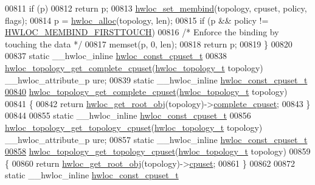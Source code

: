 \begin{DoxyCode}
00811   \textcolor{keywordflow}{if} (p)
00812     \textcolor{keywordflow}{return} p;
00813   \hyperlink{a00050_ga8b6d1d90227aff8e44ef26bc1f8a8f95}{hwloc_set_membind}(topology, cpuset, policy, flags);
00814   p = \hyperlink{a00050_gac5586e58cf25c3596b7d4aa31ce13259}{hwloc_alloc}(topology, len);
00815   \textcolor{keywordflow}{if} (p && policy != \hyperlink{a00050_ggac9764f79505775d06407b40f5e4661e8a979c7aa78dd32780858f30f47a72cca0}{HWLOC_MEMBIND_FIRSTTOUCH})
00816     \textcolor{comment}{/* Enforce the binding by touching the data */}
00817     memset(p, 0, len);
00818   \textcolor{keywordflow}{return} p;
00819 \}
00820 
00837 \textcolor{keyword}{static} \_\_hwloc\_inline \hyperlink{a00040_ga1f784433e9b606261f62d1134f6a3b25}{hwloc_const_cpuset_t}
00838 \hyperlink{a00060_ga418ebb39eaf1eac8f9cf4047cf59a534}{hwloc_topology_get_complete_cpuset}(\hyperlink{a00039_ga9d1e76ee15a7dee158b786c30b6a6e38}{hwloc_topology_t} topology) \_\_hwloc\_attribute\_p
      ure;
00839 \textcolor{keyword}{static} \_\_hwloc\_inline \hyperlink{a00040_ga1f784433e9b606261f62d1134f6a3b25}{hwloc_const_cpuset_t}
\hypertarget{a00031_source_l00840}{}\hyperlink{a00060_ga418ebb39eaf1eac8f9cf4047cf59a534}{00840} \hyperlink{a00060_ga418ebb39eaf1eac8f9cf4047cf59a534}{hwloc_topology_get_complete_cpuset}(\hyperlink{a00039_ga9d1e76ee15a7dee158b786c30b6a6e38}{hwloc_topology_t} topology)
00841 \{
00842   \textcolor{keywordflow}{return} \hyperlink{a00053_gadbf58f6e187efbdb3cd9a8e30311b7d7}{hwloc_get_root_obj}(topology)->\hyperlink{a00016_a91788a9da687beb7224cc1fd7b75208c}{complete_cpuset};
00843 \}
00844 
00855 \textcolor{keyword}{static} \_\_hwloc\_inline \hyperlink{a00040_ga1f784433e9b606261f62d1134f6a3b25}{hwloc_const_cpuset_t}
00856 \hyperlink{a00060_gaa319133e702fea664750c45735ac8a25}{hwloc_topology_get_topology_cpuset}(\hyperlink{a00039_ga9d1e76ee15a7dee158b786c30b6a6e38}{hwloc_topology_t} topology) \_\_hwloc\_attribute\_p
      ure;
00857 \textcolor{keyword}{static} \_\_hwloc\_inline \hyperlink{a00040_ga1f784433e9b606261f62d1134f6a3b25}{hwloc_const_cpuset_t}
\hypertarget{a00031_source_l00858}{}\hyperlink{a00060_gaa319133e702fea664750c45735ac8a25}{00858} \hyperlink{a00060_gaa319133e702fea664750c45735ac8a25}{hwloc_topology_get_topology_cpuset}(\hyperlink{a00039_ga9d1e76ee15a7dee158b786c30b6a6e38}{hwloc_topology_t} topology)
00859 \{
00860   \textcolor{keywordflow}{return} \hyperlink{a00053_gadbf58f6e187efbdb3cd9a8e30311b7d7}{hwloc_get_root_obj}(topology)->\hyperlink{a00016_a67925e0f2c47f50408fbdb9bddd0790f}{cpuset};
00861 \}
00862 
00872 \textcolor{keyword}{static} \_\_hwloc\_inline \hyperlink{a00040_ga1f784433e9b606261f62d1134f6a3b25}{hwloc_const_cpuset_t}

\end{DoxyCode}
